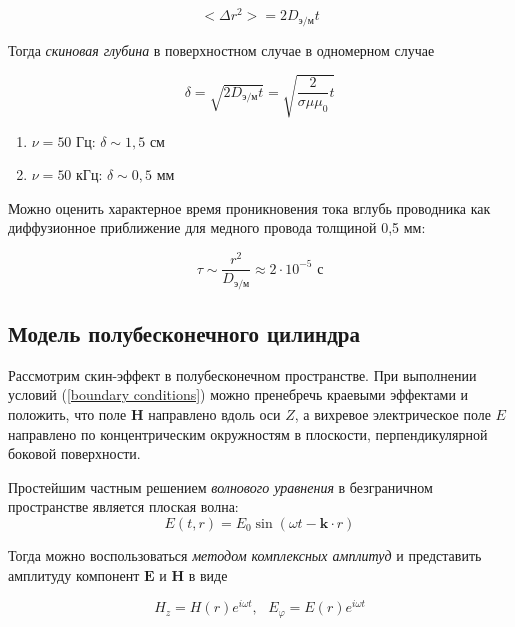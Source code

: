 \documentclass[a4paper, 12pt]{article} %
\begin{document}
\[<\Delta r^2> = 2 D_\text{э/м} t\]

Тогда \textit{скиновая глубина} в поверхностном случае в одномерном случае

\begin{equation}
    \delta = \sqrt{2D_\text{э/м} t} = \sqrt{\frac{2}{\sigma \mu \mu_0} t}
    \label{the depth of the skin layer}
\end{equation}

\begin{enumerate}
    \item $\nu = 50 \text{ Гц}$: $\delta \sim 1,5 \text{ см}$
    \item $\nu = 50 \text{ кГц}$: $\delta \sim 0,5 \text{ мм}$
\end{enumerate}

Можно оценить характерное время проникновения тока вглубь проводника как диффузионное приближение для медного провода толщиной 0,5 мм:

\[ \tau \sim \frac{r^2}{D_\text{э/м}} \approx 2 \cdot 10^{-5} \text{ с}\]


\subsection{Модель полубесконечного цилиндра}
Рассмотрим скин-эффект в полубесконечном пространстве. При выполнении условий (\ref{boundary conditions}) можно пренебречь краевыми эффектами и положить, что поле $\mathbf{H}$ направлено вдоль оси $Z$, а вихревое электрическое поле $E$ направлено по концентрическим окружностям в плоскости, перпендикулярной боковой поверхности.

 Простейшим частным решением \textit{волнового уравнения} в безграничном пространстве является плоская волна:
 \[E(t, r) = E_0 \sin{(\omega t - \mathbf{k} \cdot r)} \]

 Тогда можно воспользоваться \textit{методом комплексных амплитуд} и представить амплитуду компонент $\mathbf{E} \text{ и } \mathbf{H}$ в виде

 \begin{equation}
     H_z = H(r) e^{i \omega t}, \text{    } E_\varphi = E(r) e^{i \omega t} 
 \end{equation}
\end{document}
